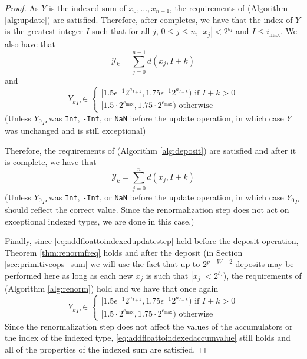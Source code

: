   \begin{proof}
    As $Y$ is the indexed sum of $x_0, ..., x_{n - 1}$, the requirements of  (Algorithm \ref{alg:update}) are satisfied. Therefore, after  completes, we have that the index of $Y$ is the greatest integer $I$ such that for all $j$, $0 \leq j \leq n$, $|x_j| < 2^{b_I}$ and $I \leq i_{\max}$. We also have that 
\[
\mathcal{Y}_k = \sum\limits_{j = 0}^{n - 1} d(x_j, I + k)
\]
  and
  \begin{equation}
          {Y_k}_P \in \begin{cases}[1.5  \epsilon^{-1} 2^{a_{I + k}}, 1.75  \epsilon^{-1} 2^{a_{I + k}}) \text{ if } I + k > 0 \\ [1.5 \cdot 2^{e_{\max}}, 1.75 \cdot 2^{e_{\max}})\text{ otherwise}\end{cases} \label{eq:addfloattoindexedupdatestep}
  \end{equation}
  (Unless ${Y_0}_P$ was \texttt{Inf}, \texttt{-Inf}, or \texttt{NaN} before the update operation, in which case $Y$ was unchanged and is still exceptional)

  Therefore, the requirements of  (Algorithm \ref{alg:deposit}) are satisfied and after it is complete, we have that
  \begin{equation}
    \mathcal{Y}_k = \sum\limits_{j = 0}^{n} d(x_j, I + k)
    \label{eq:addfloattoindexedaccumvalue}
  \end{equation}
  (Unless ${Y_0}_P$ was \texttt{Inf}, \texttt{-Inf}, or \texttt{NaN} before the update operation, in which case ${Y_0}_P$ should reflect the correct value. Since the renormalization step does not act on exceptional indexed types, we are done in this case.)

  Finally, since \eqref{eq:addfloattoindexedupdatestep} held before the deposit operation, Theorem \ref{thm:renormfreq} holds and after the deposit (in Section \ref{sec:primitiveops_sum} we will use the fact that up to $2^{p - W - 2}$ deposits may be performed here as long as each new $x_j$ is such that $|x_j| < 2^{b_I}$), the requirements of  (Algorithm \ref{alg:renorm}) hold and we have that once again
  \[
  {Y_k}_P \in \begin{cases}[1.5  \epsilon^{-1} 2^{a_{I + k}}, 1.75  \epsilon^{-1} 2^{a_{I + k}}) \text{ if } I + k > 0 \\ [1.5 \cdot 2^{e_{\max}}, 1.75 \cdot 2^{e_{\max}})\text{ otherwise}\end{cases}
  \]
  Since the renormalization step does not affect the values of the accumulators or the index of the indexed type, \eqref{eq:addfloattoindexedaccumvalue} still holds and all of the properties of the indexed sum are satisfied.
  \end{proof}

